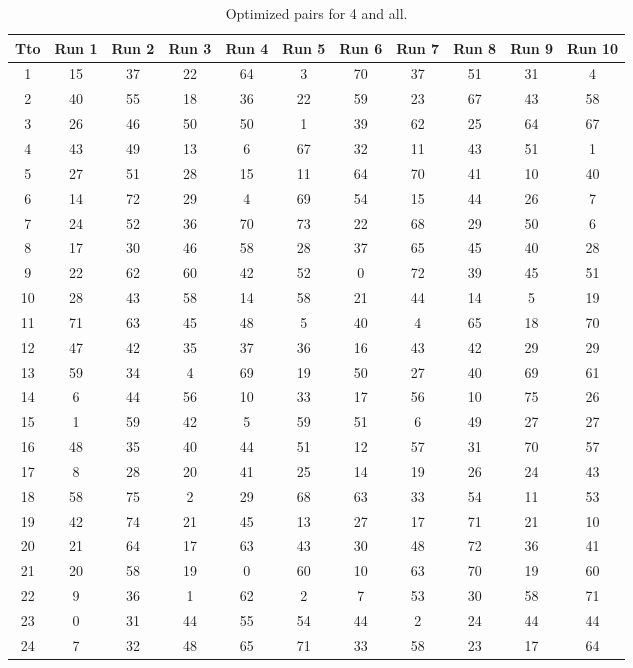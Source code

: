 \begin{table}
  \centering
  \scriptsize
  \caption{Optimized pairs for 4 and all.}
  \label{tab_pairs}
\begin{tabular}{c c c c c c c c c c c }
\hline
Tto & Run 1 & Run 2 & Run 3 & Run 4 & Run 5 & Run 6 & Run 7 & Run 8 & Run 9 & Run 10 \\
\hline
1 & 15 & 37 & 22 & 64 & 3 & 70 & 37 & 51 & 31 & 4 \\
2 & 40 & 55 & 18 & 36 & 22 & 59 & 23 & 67 & 43 & 58 \\
3 & 26 & 46 & 50 & 50 & 1 & 39 & 62 & 25 & 64 & 67 \\
4 & 43 & 49 & 13 & 6 & 67 & 32 & 11 & 43 & 51 & 1 \\
5 & 27 & 51 & 28 & 15 & 11 & 64 & 70 & 41 & 10 & 40 \\
6 & 14 & 72 & 29 & 4 & 69 & 54 & 15 & 44 & 26 & 7 \\
7 & 24 & 52 & 36 & 70 & 73 & 22 & 68 & 29 & 50 & 6 \\
8 & 17 & 30 & 46 & 58 & 28 & 37 & 65 & 45 & 40 & 28 \\
9 & 22 & 62 & 60 & 42 & 52 & 0 & 72 & 39 & 45 & 51 \\
10 & 28 & 43 & 58 & 14 & 58 & 21 & 44 & 14 & 5 & 19 \\
11 & 71 & 63 & 45 & 48 & 5 & 40 & 4 & 65 & 18 & 70 \\
12 & 47 & 42 & 35 & 37 & 36 & 16 & 43 & 42 & 29 & 29 \\
13 & 59 & 34 & 4 & 69 & 19 & 50 & 27 & 40 & 69 & 61 \\
14 & 6 & 44 & 56 & 10 & 33 & 17 & 56 & 10 & 75 & 26 \\
15 & 1 & 59 & 42 & 5 & 59 & 51 & 6 & 49 & 27 & 27 \\
16 & 48 & 35 & 40 & 44 & 51 & 12 & 57 & 31 & 70 & 57 \\
17 & 8 & 28 & 20 & 41 & 25 & 14 & 19 & 26 & 24 & 43 \\
18 & 58 & 75 & 2 & 29 & 68 & 63 & 33 & 54 & 11 & 53 \\
19 & 42 & 74 & 21 & 45 & 13 & 27 & 17 & 71 & 21 & 10 \\
20 & 21 & 64 & 17 & 63 & 43 & 30 & 48 & 72 & 36 & 41 \\
21 & 20 & 58 & 19 & 0 & 60 & 10 & 63 & 70 & 19 & 60 \\
22 & 9 & 36 & 1 & 62 & 2 & 7 & 53 & 30 & 58 & 71 \\
23 & 0 & 31 & 44 & 55 & 54 & 44 & 2 & 24 & 44 & 44 \\
24 & 7 & 32 & 48 & 65 & 71 & 33 & 58 & 23 & 17 & 64 \\

\end{tabular}
\end{table}
